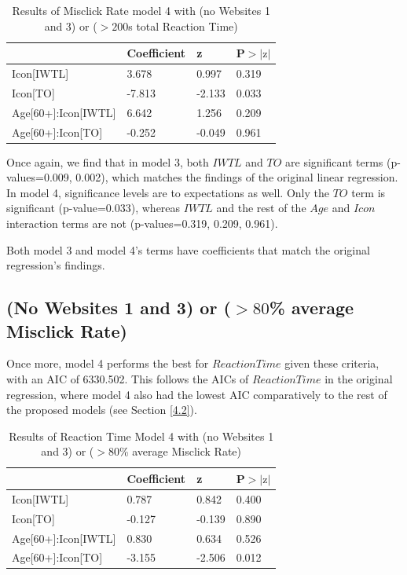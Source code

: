 \documentclass[12pt,twoside]{reedthesis}
\begin{document}
    \begin{table}[H]
        \centering
        \begin{tabular}{| p{5cm} | p{2.5cm} | p{2.5cm} | p{2.5cm} |}
            \hline
            & Coefficient & z & P$>|\text{z}|$\\
            \hline
            Icon[IWTL] & 3.678 & 0.997 & 0.319\\
            \hline
            Icon[TO] &-7.813 & -2.133 &  0.033\\
            \hline
            Age[60+]:Icon[IWTL] &  6.642 & 1.256  & 0.209\\
            \hline
            Age[60+]:Icon[TO] & -0.252  &  -0.049 &  0.961\\
            \hline
        \end{tabular}
        \caption{Results of Misclick Rate model 4 with (no Websites 1 and 3) or ($>200$s total Reaction Time)}
        \label{n13_200_m4_mr}
    \end{table}

    Once again, we find that in model 3, both $IWTL$ and $TO$ are significant terms (p-values=0.009, 0.002), which matches the findings of the original linear regression. In model 4, significance levels are to expectations as well. Only the $TO$ term is significant (p-value=0.033), whereas $IWTL$ and the rest of the $Age$ and $Icon$ interaction terms are not (p-values=0.319, 0.209, 0.961). 

    Both model 3 and model 4's terms have coefficients that match the original regression's findings.

\subsection{(No Websites 1 and 3) or ($>80$\% average Misclick Rate)}\label{4.3.4}

    Once more, model 4 performs the best for $ReactionTime$ given these criteria, with an AIC of 6330.502. This follows the AICs of $ReactionTime$ in the original regression, where model 4 also had the lowest AIC comparatively to the rest of the proposed models (see Section \ref{4.2}).

    \begin{table}[h!]
        \centering
        \begin{tabular}{| p{5cm} | p{2.5cm} | p{2.5cm} | p{2.5cm} |}
            \hline
            & Coefficient & z & P$>|\text{z}|$\\
            \hline
            Icon[IWTL] & 0.787 & 0.842 & 0.400\\
            \hline
            Icon[TO] & -0.127 & -0.139 & 0.890\\
            \hline
            Age[60+]:Icon[IWTL] &  0.830 & 0.634 & 0.526\\
            \hline
            Age[60+]:Icon[TO] & -3.155 & -2.506 & 0.012\\
            \hline
        \end{tabular}
        \caption{Results of Reaction Time Model 4 with (no Websites 1 and 3) or ($>80$\% average Misclick Rate)}
        \label{n13_80_speed_m4}
    \end{table}
\end{document}
